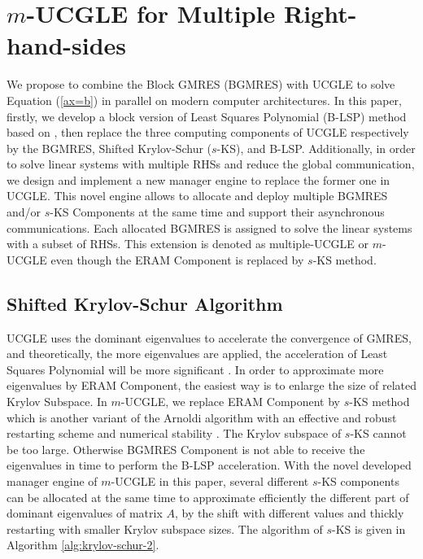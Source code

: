 \section{$m$-UCGLE for Multiple Right-hand-sides}

We propose to combine the Block GMRES (BGMRES) \cite{vital1990etude} with UCGLE \cite{wu2018distributed} to solve Equation (\ref{ax=b}) in parallel on modern computer architectures. In this paper, firstly, we develop a block version of Least Squares Polynomial (B-LSP) method based on \cite{saad1987least}, then replace the three computing components of UCGLE respectively by the BGMRES, Shifted Krylov-Schur ($s$-KS), and B-LSP. Additionally, in order to solve linear systems with multiple RHSs and reduce the global communication, we design and implement a new manager engine to replace the former one in UCGLE. This novel engine allows to allocate and deploy multiple BGMRES and/or $s$-KS Components at the same time and support their asynchronous communications. Each allocated BGMRES is assigned to solve the linear systems with a subset of RHSs. This extension is denoted as multiple-UCGLE or $m$-UCGLE even though the ERAM Component is replaced by $s$-KS method. 

\subsection{Shifted Krylov-Schur Algorithm}

UCGLE uses the dominant eigenvalues to accelerate the convergence of GMRES, and theoretically, the more eigenvalues are applied, the acceleration of Least Squares Polynomial will be more significant \cite{wu2018distributed}.  In order to approximate more eigenvalues by ERAM Component, the easiest way is to enlarge the size of related Krylov Subspace. In $m$-UCGLE, we replace ERAM Component by $s$-KS method which is another variant of the Arnoldi algorithm with an effective and robust restarting scheme and numerical stability \cite{stewart2002krylov}. The Krylov subspace of  $s$-KS cannot be too large. Otherwise BGMRES Component is not able to receive the eigenvalues in time to perform the B-LSP acceleration. With the novel developed manager engine of $m$-UCGLE in this paper, several different $s$-KS components can be allocated at the same time to approximate efficiently the different part of dominant eigenvalues of matrix $A$, by the shift with different values and thickly restarting with smaller Krylov subspace sizes. The algorithm of $s$-KS is given in Algorithm \ref{alg:krylov-schur-2}.

